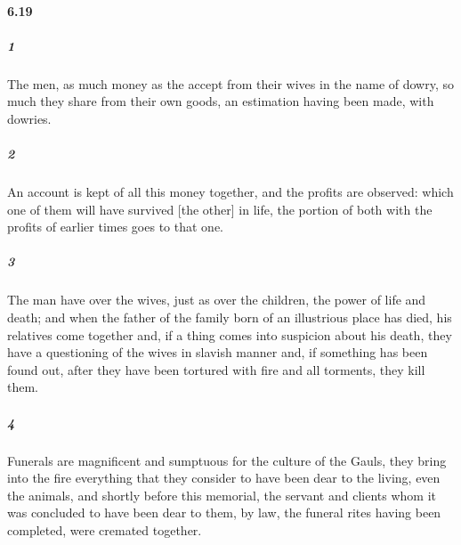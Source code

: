 \documentclass[12pt]{article}
\begin{document}
\paragraph{6.19}
\subparagraph{1}
The men, as much money as the accept from their wives in the name of dowry, so much they share from their own goods, an estimation having been made, with dowries.
\subparagraph{2}
An account is kept of all this money together, and the profits are observed: which one of them will have survived [the other] in life, the portion of both with the profits of earlier times goes to that one.
\subparagraph{3}
The man have over the wives, just as over the children, the power of life and death; and when the father of the family born of an illustrious place has died, his relatives come together and, if a thing comes into suspicion about his death, they have a questioning of the wives in slavish manner and, if something has been found out, after they have been tortured with fire and all torments, they kill them.
\subparagraph{4}
Funerals are magnificent and sumptuous for the culture of the Gauls, they bring into the fire everything that they consider to have been dear to the living, even the animals, and shortly before this memorial, the servant and clients whom it was concluded to have been dear to them, by law, the funeral rites having been completed, were cremated together. 
\end{document}
